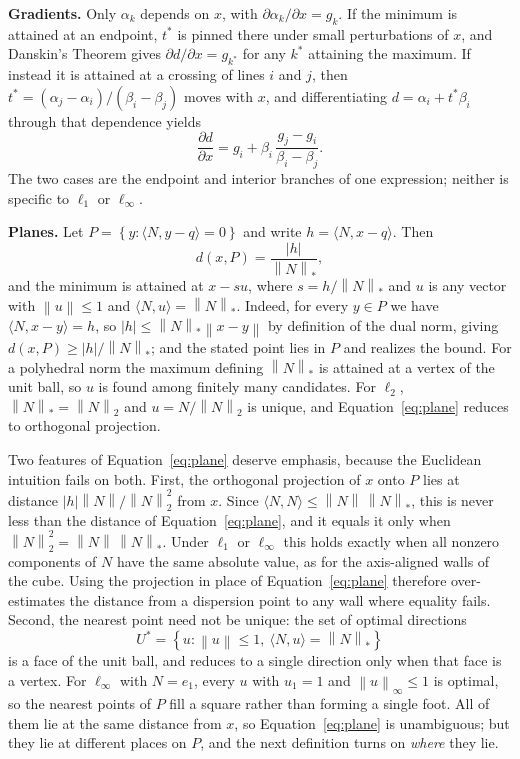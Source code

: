 \documentclass[preprint,12pt]{elsarticle}
\theoremstyle{remark}
\newcommand{\ang}[1]{\langle #1 \rangle}
\newcommand{\set}[1]{\left\{ #1 \right\}}
\def \abs#1{\left| #1 \right|}
\def \norm#1{\left\|#1 \right\|}
\begin{document}
\textbf{Gradients.} Only $\alpha_k$ depends on $x$, with $\partial \alpha_k /
\partial x = g_k$. If the minimum is attained at an endpoint, $t^*$ is pinned
there under small perturbations of $x$, and Danskin's Theorem gives $\partial d
/ \partial x = g_{k^*}$ for any $k^*$ attaining the maximum. If instead it is
attained at a crossing of lines $i$ and $j$, then $t^* = (\alpha_j -
\alpha_i)/(\beta_i - \beta_j)$ moves with $x$, and differentiating $d = \alpha_i
+ t^* \beta_i$ through that dependence yields
\begin{equation*}
  \frac{\partial d}{\partial x}
  = g_i + \beta_i \, \frac{g_j - g_i}{\beta_i - \beta_j}.
\end{equation*}
The two cases are the endpoint and interior branches of one expression; neither
is specific to $\ell_1$ or $\ell_\infty$.

\textbf{Planes.} Let $P = \set{y : \ang{N, y - q} = 0}$ and write $h = \ang{N, x
- q}$. Then
\begin{equation}
  d(x, P) = \frac{\abs{h}}{\norm{N}_*},
  \label{eq:plane}
\end{equation}
and the minimum is attained at $x - s u$, where $s = h / \norm{N}_*$ and $u$ is
any vector with $\norm{u} \le 1$ and $\ang{N, u} = \norm{N}_*$. Indeed, for
every $y \in P$ we have $\ang{N, x - y} = h$, so $\abs{h} \le \norm{N}_* \norm{x
- y}$ by definition of the dual norm, giving $d(x, P) \ge \abs{h} / \norm{N}_*$;
and the stated point lies in $P$ and realizes the bound. For a polyhedral norm
the maximum defining $\norm{N}_*$ is attained at a vertex of the unit ball, so
$u$ is found among finitely many candidates. For $\ell_2$, $\norm{N}_* =
\norm{N}_2$ and $u = N / \norm{N}_2$ is unique, and Equation~\ref{eq:plane}
reduces to orthogonal projection.

Two features of Equation~\ref{eq:plane} deserve emphasis, because the Euclidean
intuition fails on both. First, the orthogonal projection of $x$ onto $P$ lies
at distance $\abs{h} \norm{N} / \norm{N}_2^2$ from $x$. Since $\ang{N, N} \le
\norm{N} \, \norm{N}_*$, this is never less than the distance of
Equation~\ref{eq:plane}, and it equals it only when $\norm{N}_2^2 = \norm{N} \,
\norm{N}_*$. Under $\ell_1$ or $\ell_\infty$ this holds exactly when all nonzero
components of $N$ have the same absolute value, as for the axis-aligned walls of
the cube. Using the projection in place of Equation~\ref{eq:plane} therefore
over-estimates the distance from a dispersion point to any wall where equality
fails. Second, the nearest point need not be unique: the set of optimal
directions
\begin{equation*}
  U^* = \set{u : \norm{u} \le 1, \ \ang{N, u} = \norm{N}_*}
\end{equation*}
is a face of the unit ball, and reduces to a single direction only when that
face is a vertex. For $\ell_\infty$ with $N = e_1$, every $u$ with $u_1 = 1$ and
$\norm{u}_\infty \le 1$ is optimal, so the nearest points of $P$ fill a square
rather than forming a single foot. All of them lie at the same distance from
$x$, so Equation~\ref{eq:plane} is unambiguous; but they lie at different places
on $P$, and the next definition turns on \emph{where} they lie.
\end{document}
